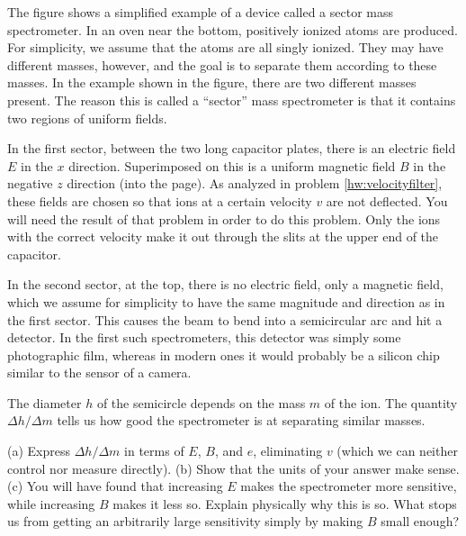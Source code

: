 The figure shows a simplified example of a device called a sector mass
spectrometer. In an oven near the bottom, positively ionized atoms are
produced. For simplicity, we assume that the atoms are all singly ionized.
They may have different masses, however, and the goal is to separate them according to these
masses. In the example shown in the figure, there are two different masses present.
The reason this is called a ``sector'' mass spectrometer is that it contains
two regions of uniform fields.

In the first sector, between the two long capacitor
plates, there is an electric field $E$ in the $x$ direction. Superimposed on
this is a uniform magnetic field $B$ in the negative $z$ direction (into the page).
As analyzed in problem \ref{hw:velocityfilter}, these fields are chosen so that
ions at a certain velocity $v$ are not deflected. You will need the result of
that problem in order to do this problem. Only the ions with the correct
velocity make it out through the slits at the upper end of the capacitor.

In the second sector, at the top, there is no electric field, only a magnetic
field, which we assume for simplicity to have the same magnitude and direction
as in the first sector. This causes the beam to bend into a semicircular arc
and hit a detector. In the first such spectrometers, this detector was simply
some photographic film, whereas in modern ones it would probably be a silicon
chip similar to the sensor of a camera.

The diameter $h$ of the semicircle depends on the mass $m$ of the ion.
The quantity $\Delta h/\Delta m$ tells us how good the spectrometer is at
separating similar masses.

\noindent (a) Express $\Delta h/\Delta m$ in terms
of $E$, $B$, and $e$, eliminating $v$ (which we can neither control nor measure
directly).\answercheck\hwendpart
(b) Show that the units of your answer make sense.\hwendpart
(c) You will
have found that increasing $E$ makes the spectrometer more sensitive, while
increasing $B$ makes it less so. Explain physically why this is so. What stops
us from getting an arbitrarily large sensitivity simply by making $B$ small
enough?

